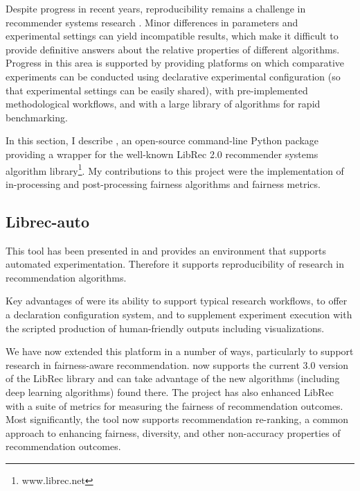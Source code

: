 
Despite progress in recent years, reproducibility remains a challenge in recommender systems research \cite{beel2016towards}. Minor differences in parameters and experimental settings can yield incompatible results, which make it difficult to provide definitive answers about the relative properties of different algorithms. Progress in this area is supported by providing platforms on which comparative experiments can be conducted using declarative experimental configuration (so that experimental settings can be easily shared), with pre-implemented methodological workflows, and with a large library of algorithms for rapid benchmarking. 

In this section, I describe \libauto{}, an open-source command-line Python package providing a wrapper for the well-known LibRec 2.0 recommender systems algorithm library\footnote{www.librec.net}. My contributions to this project were the implementation of in-processing and post-processing fairness algorithms and fairness metrics.

\subsection{Librec-auto}
This tool has been presented in \cite{mansoury2018automating} and provides an environment that supports automated experimentation. Therefore it supports reproducibility of research in recommendation algorithms.

Key advantages of \libauto{} were its ability to support typical research workflows, to offer a declaration configuration system, and to supplement experiment execution with the scripted production of human-friendly outputs including visualizations.

We have now extended this platform in a number of ways, particularly to support research in fairness-aware recommendation. \libauto{} now supports the current 3.0 version of the LibRec library and can take advantage of the new algorithms (including deep learning algorithms) found there. The \libauto{} project has also enhanced LibRec with a suite of metrics for measuring the fairness of recommendation outcomes. Most significantly, the tool now supports recommendation re-ranking, a common approach to enhancing fairness, diversity, and other non-accuracy properties of recommendation outcomes.

